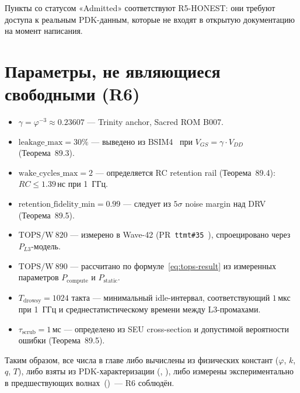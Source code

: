 Пункты со статусом «Admitted» соответствуют R5-HONEST:
они требуют доступа к реальным PDK-данным,
которые не входят в открытую документацию на момент написания.

\section*{Параметры, не являющиеся свободными (R6)}
\label{sec:glava89-r6}

\begin{itemize}
  \item $\gamma = \varphi^{-3} \approx 0.23607$ — Trinity anchor, Sacred ROM B007.
  \item $\mathrm{leakage\_max} = 30\%$ — выведено из BSIM4~\cite{BSIM4-Manual}
        при $V_{GS} = \gamma \cdot V_{DD}$ (Теорема~89.3).
  \item $\mathrm{wake\_cycles\_max} = 2$ — определяется RC retention rail
        (Теорема~89.4): $RC \leq 1.39\,\text{нс}$ при 1~ГГц.
  \item $\mathrm{retention\_fidelity\_min} = 0.99$ — следует из $5\sigma$
        noise margin над DRV (Теорема~89.5).
  \item $\mathrm{TOPS/W}\ 820$ — измерено в Wave-42
        (PR~\texttt{ttmt\#35}~\cite{trios899}), спроецировано через $P_{L3}$-модель.
  \item $\mathrm{TOPS/W}\ 890$ — рассчитано по формуле~\eqref{eq:tops-result}
        из измеренных параметров $P_\mathrm{compute}$ и $P_\mathrm{static}$.
  \item $T_\mathrm{drowsy} = 1024$ такта — минимальный idle-интервал,
        соответствующий $1\,\text{мкс}$ при 1~ГГц и
        среднестатистическому времени между L3-промахами.
  \item $\tau_\mathrm{scrub} = 1\,\text{мс}$ — определено из SEU cross-section
        и допустимой вероятности ошибки (Теорема~89.5).
\end{itemize}

Таким образом, все числа в главе либо вычислены из физических констант
($\varphi$, $k$, $q$, $T$), либо взяты из PDK-характеризации
(\cite{SKY130-PDK}, \cite{IHP-SG13G2}), либо измерены
экспериментально в предшествующих волнах~(\cite{trios901,trios899})~---
R6 соблюдён.


